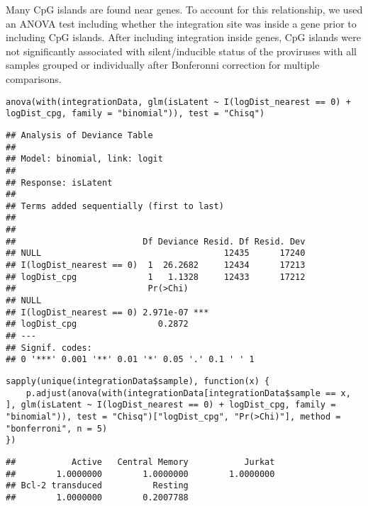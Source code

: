 \documentclass[../../sherrill-Mix_thesis.tex]{subfiles}
\makeatletter
\newenvironment{kframe}{%
 \def\at@end@of@kframe{}%
 \ifinner\ifhmode%
  \def\at@end@of@kframe{\end{minipage}}%
  \begin{minipage}{\columnwidth}%
 \fi\fi%
 \def\FrameCommand##1{\hskip\@totalleftmargin \hskip-\fboxsep
 \colorbox{shadecolor}{##1}\hskip-\fboxsep
     \hskip-\linewidth \hskip-\@totalleftmargin \hskip\columnwidth}%
 \MakeFramed {\advance\hsize-\width
   \@totalleftmargin\z@ \linewidth\hsize
   \@setminipage}}%
 {\par\unskip\endMakeFramed%
 \at@end@of@kframe}
\newenvironment{knitrout}{}{} %
\makeatother
\begin{document}
Many CpG islands are found near genes. To account for this relationship, we used an ANOVA test including whether the integration site was inside a gene prior to including CpG islands. After including integration inside genes, CpG islands were not significantly associated with silent/inducible status of the proviruses with all samples grouped or individually after Bonferonni correction for multiple comparisons.
\begin{knitrout}
\color{fgcolor}\begin{kframe}
\begin{lstlisting}[basicstyle=\ttfamily,breaklines=true]
anova(with(integrationData, glm(isLatent ~ I(logDist_nearest == 0) + logDist_cpg, family = "binomial")), test = "Chisq")\end{lstlisting}
\begin{lstlisting}[basicstyle=\ttfamily,breaklines=true]
## Analysis of Deviance Table
## 
## Model: binomial, link: logit
## 
## Response: isLatent
## 
## Terms added sequentially (first to last)
## 
## 
##                         Df Deviance Resid. Df Resid. Dev
## NULL                                    12435      17240
## I(logDist_nearest == 0)  1  26.2682     12434      17213
## logDist_cpg              1   1.1328     12433      17212
##                          Pr(>Chi)    
## NULL                                 
## I(logDist_nearest == 0) 2.971e-07 ***
## logDist_cpg                0.2872    
## ---
## Signif. codes:  
## 0 '***' 0.001 '**' 0.01 '*' 0.05 '.' 0.1 ' ' 1
\end{lstlisting}
\begin{lstlisting}[basicstyle=\ttfamily,breaklines=true]
sapply(unique(integrationData$sample), function(x) {
    p.adjust(anova(with(integrationData[integrationData$sample == x, ], glm(isLatent ~ I(logDist_nearest == 0) + logDist_cpg, family = "binomial")), test = "Chisq")["logDist_cpg", "Pr(>Chi)"], method = "bonferroni", n = 5)
})\end{lstlisting}
\begin{lstlisting}[basicstyle=\ttfamily,breaklines=true]
##           Active   Central Memory           Jurkat 
##        1.0000000        1.0000000        1.0000000 
## Bcl-2 transduced          Resting 
##        1.0000000        0.2007788
\end{lstlisting}
\end{kframe}
\end{knitrout}
\end{document}
